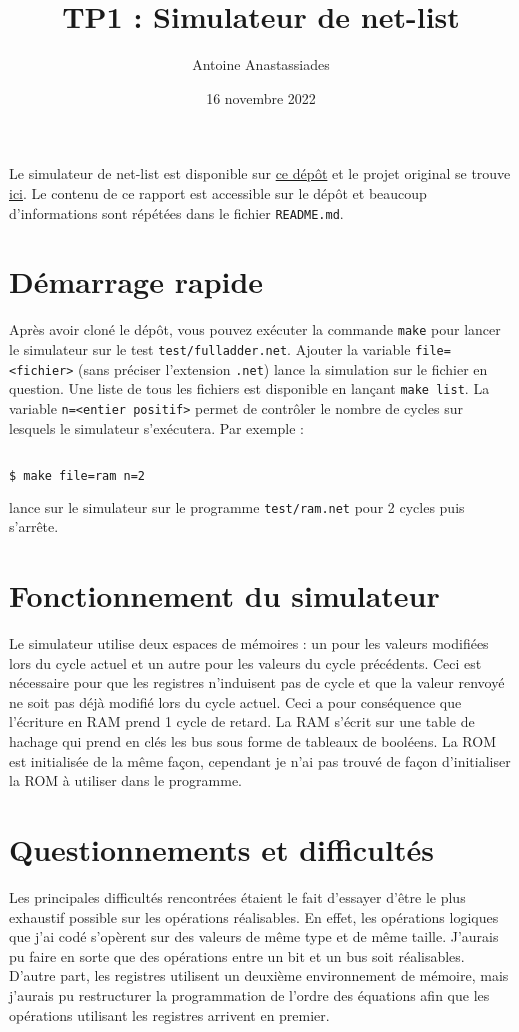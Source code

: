 \documentclass{article}
\title{TP1 : Simulateur de net-list}
\author{Antoine Anastassiades}
\date{16 novembre 2022}
\begin{document}
\maketitle

Le simulateur de net-list est disponible sur \href{https://github.com/a-ananas/sysnum2022_tp1}{ce dépôt} et le projet original se trouve \href{https://github.com/hbens/sysnum-2022/tree/master/tp1}{ici}. Le contenu de ce rapport est accessible sur le dépôt et beaucoup d'informations sont répétées dans le fichier \texttt{README.md}.

\section{Démarrage rapide}
Après avoir cloné le dépôt, vous pouvez exécuter la commande \texttt{make} pour lancer le simulateur sur le test \texttt{test/fulladder.net}. Ajouter la variable \texttt{file=<fichier>} (sans préciser l'extension \texttt{.net}) lance la simulation sur le fichier en question. Une liste de tous les fichiers est disponible en lançant \texttt{make list}. La variable \texttt{n=<entier positif>} permet de contrôler le nombre de cycles sur lesquels le simulateur s'exécutera. Par exemple :
\begin{lstlisting}[language=Bash]

$ make file=ram n=2

\end{lstlisting}

lance sur le simulateur sur le programme \texttt{test/ram.net} pour 2 cycles puis s'arrête.

\section{Fonctionnement du simulateur}

Le simulateur utilise deux espaces de mémoires : un pour les valeurs modifiées lors du cycle actuel et un autre pour les valeurs du cycle précédents. Ceci est nécessaire pour que les registres n'induisent pas de cycle et que la valeur renvoyé ne soit pas déjà modifié lors du cycle actuel. Ceci a pour conséquence que l'écriture en RAM prend 1 cycle de retard. La RAM s'écrit sur une table de hachage qui prend en clés les bus sous forme de tableaux de booléens. La ROM est initialisée de la même façon, cependant je n'ai pas trouvé de façon d'initialiser la ROM à utiliser dans le programme.

\section{Questionnements et difficultés}

Les principales difficultés rencontrées étaient le fait d'essayer d'être le plus exhaustif possible sur les opérations réalisables. En effet, les opérations logiques que j'ai codé s'opèrent sur des valeurs de même type et de même taille. J'aurais pu faire en sorte que des opérations entre un bit et un bus soit réalisables. D'autre part, les registres utilisent un deuxième environnement de mémoire, mais j'aurais pu restructurer la programmation de l'ordre des équations afin que les opérations utilisant les registres arrivent en premier.
\end{document}
